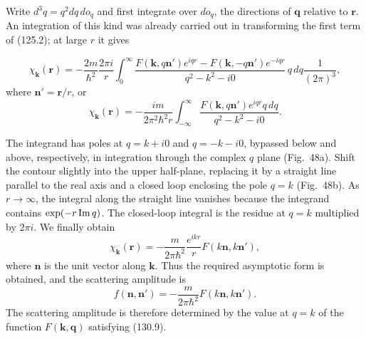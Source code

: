 Write $d^3q=q^2dq\,do_q$ and first integrate over $do_q$, the directions of
$\mathbf q$ relative to $\mathbf r$. An integration of this kind was already
carried out in transforming the first term of (125.2); at large $r$ it gives

\[
 \chi_{\mathbf k}(\mathbf r)=-\frac{2m}{\hbar^2}\frac{2\pi i}{r}
 \int_0^\infty
 \frac{F(\mathbf k,q\mathbf n')e^{iqr}-F(\mathbf k,-q\mathbf n')e^{-iqr}}
 {q^2-k^2-i0}\,q\,dq\frac1{(2\pi)^3},
\]
where $\mathbf n'=\mathbf r/r$, or
\[
 \chi_{\mathbf k}(\mathbf r)=-\frac{im}{2\pi^2\hbar^2r}
 \int_{-\infty}^{\infty}
 \frac{F(\mathbf k,q\mathbf n')e^{iqr}q\,dq}{q^2-k^2-i0}.
\]

The integrand has poles at $q=k+i0$ and $q=-k-i0$, bypassed below and above,
respectively, in integration through the complex $q$ plane (Fig.~48a). Shift
the contour slightly into the upper half-plane, replacing it by a straight
line parallel to the real axis and a closed loop enclosing the pole $q=k$
(Fig.~48b). As $r\to\infty$, the integral along the straight line vanishes
because the integrand contains $\exp(-r\mathop{\rm Im}q)$. The closed-loop
integral is the residue at $q=k$ multiplied by $2\pi i$. We finally obtain
\begin{equation}
 \chi_{\mathbf k}(\mathbf r)=-\frac{m}{2\pi\hbar^2}
 \frac{e^{ikr}}rF(k\mathbf n,k\mathbf n'),
 \tag{130.11}
\end{equation}
where $\mathbf n$ is the unit vector along $\mathbf k$. Thus the required
asymptotic form is obtained, and the scattering amplitude is
\begin{equation}
 f(\mathbf n,\mathbf n')=-\frac{m}{2\pi\hbar^2}
 F(k\mathbf n,k\mathbf n').
 \tag{130.12}
\end{equation}
The scattering amplitude is therefore determined by the value at $q=k$ of the
function $F(\mathbf k,\mathbf q)$ satisfying (130.9).

\begin{figure}[htbp]
\centering
{}
\caption{}
\label{fig:48}
\end{figure}

